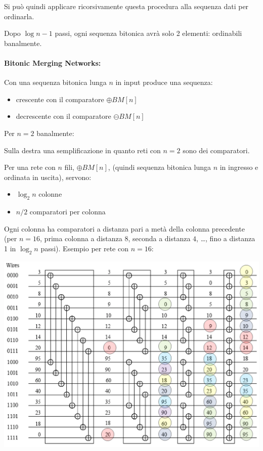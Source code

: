 Si può quindi applicare ricorsivamente questa procedura alla sequenza dati per ordinarla.

Dopo $\log n - 1$ passi, ogni sequenza bitonica avrà solo 2 elementi: ordinabili banalmente.

\paragraph{Bitonic Merging Networks:} Con una sequenza bitonica lunga $n$ in input produce una sequenza: 
\begin{itemize}
    \item crescente con il comparatore $\oplus BM [n]$
    
    \item decrescente con il comparatore $\ominus BM [n]$
\end{itemize}

Per $n = 2$ banalmente:
\begin{center}
    
    
\end{center}

\begin{center}
    
    
\end{center}

Sulla destra una semplificazione in quanto reti con $n = 2$ sono dei comparatori.

Per una rete con $n$ fili, $\oplus BM [n]$, (quindi sequenza bitonica lunga $n$ in ingresso e ordinata in uscita), servono: 
\begin{itemize}
    \item $\log_2 n$ colonne
    
    \item $n/2$ comparatori per colonna
\end{itemize}

Ogni colonna ha comparatori a distanza pari a metà della colonna precedente (per $n=16$, prima colonna a distanza $8$, seconda a distanza $4$, \dots, fino a distanza 1 in $\log_2 n$ passi). Esempio per rete con $n = 16$:
\begin{center}
    \includegraphics[width=0.79\columnwidth]{img/pattern/n16}
\end{center}

